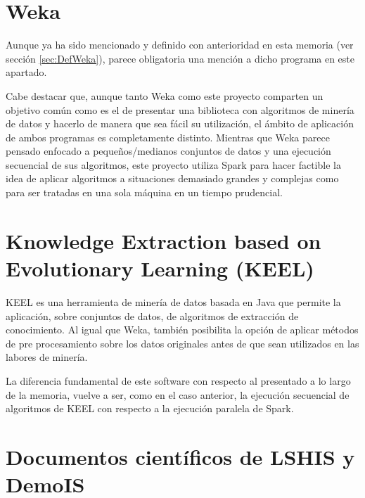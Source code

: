 

\section{Weka}

Aunque ya ha sido mencionado y definido con anterioridad en esta memoria (ver sección \ref{sec:DefWeka}), parece obligatoria una mención a dicho programa en este apartado.

Cabe destacar que, aunque tanto Weka como este proyecto comparten un objetivo común como es el de presentar una biblioteca con algoritmos de minería de datos y hacerlo de manera que sea fácil su utilización, el ámbito de aplicación de ambos programas es completamente distinto. Mientras que Weka parece pensado enfocado a pequeños/medianos conjuntos de datos y una ejecución secuencial de sus algoritmos, este proyecto utiliza Spark para hacer factible la idea de aplicar algoritmos a situaciones demasiado grandes y complejas como para ser tratadas en una sola máquina en un tiempo prudencial.

\section{Knowledge Extraction based on Evolutionary Learning (KEEL)}

KEEL \cite{KEELSoft1,KEELSoft2} es una herramienta de minería de datos basada en Java que permite la aplicación, sobre conjuntos de datos, de algoritmos de extracción de conocimiento. Al igual que Weka, también posibilita la opción de aplicar métodos de pre procesamiento sobre los datos originales antes de que sean utilizados en las labores de minería.

La diferencia fundamental de este software con respecto al presentado a lo largo de la memoria, vuelve a ser, como en el caso anterior, la ejecución secuencial de algoritmos de KEEL con respecto a la ejecución paralela de Spark.

\section{Documentos científicos de LSHIS y DemoIS}

